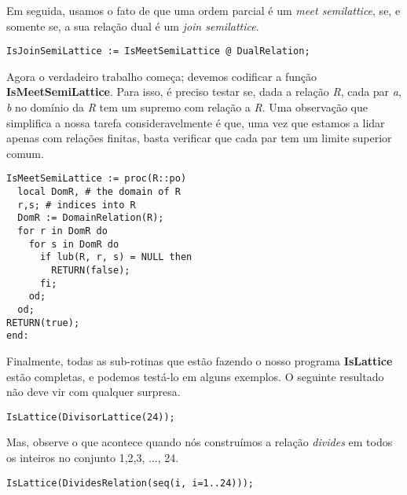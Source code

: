 \documentclass[a4paper]{article}
\begin{document}
Em seguida, usamos o fato de que uma ordem parcial é um \textit{meet semilattice}, se, e somente se, a sua relação dual é um \textit{join semilattice}.

\begin{lstlisting}
IsJoinSemiLattice := IsMeetSemiLattice @ DualRelation;
\end{lstlisting}

Agora o verdadeiro trabalho começa; devemos codificar a função \textbf{IsMeetSemiLattice}. Para isso, é preciso testar se, dada a relação \textit{R}, cada par \textit{a}, \textit{b} no domínio da \textit{R} tem um supremo com relação a \textit{R}. Uma observação que simplifica a nossa tarefa consideravelmente é que, uma vez que estamos a lidar apenas com relações finitas, basta verificar que cada par tem um limite superior comum.

\begin{lstlisting}
IsMeetSemiLattice := proc(R::po)
  local DomR, # the domain of R
  r,s; # indices into R
  DomR := DomainRelation(R);
  for r in DomR do
    for s in DomR do
      if lub(R, r, s) = NULL then
        RETURN(false);
      fi;
    od;
  od;
RETURN(true);
end:
\end{lstlisting}

Finalmente, todas as sub-rotinas que estão fazendo o nosso programa \textbf{IsLattice} estão completas, e podemos testá-lo em alguns exemplos. O seguinte resultado não deve vir com qualquer surpresa.

\begin{lstlisting}
IsLattice(DivisorLattice(24));
\end{lstlisting}

Mas, observe o que acontece quando nós construímos a relação \textit{divides} em todos os inteiros no conjunto {1,2,3, ..., 24}.

\begin{lstlisting}
IsLattice(DividesRelation(seq(i, i=1..24)));
\end{lstlisting}
\end{document}
